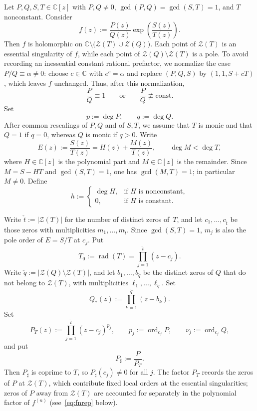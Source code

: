 \documentclass[reqno]{article}
\theoremstyle{definition}
\theoremstyle{remark}
\theoremstyle{plain}
\newcommand{\C}{\mathbb C}
\newcommand{\Z}{\mathcal Z}
\newcommand{\rad}{\operatorname{rad}}
\newcommand{\ord}{\operatorname{ord}}
\begin{document}
Let $P,Q,S,T\in\C[z]$ with $P,Q\ne0$, $\gcd(P,Q)=\gcd(S,T)=1$, and $T$ nonconstant. Consider
\begin{equation}\label{eq:fdef}
f(z):=\frac{P(z)}{Q(z)}\exp\!\left(\frac{S(z)}{T(z)}\right).
\end{equation}
Then $f$ is holomorphic on $\C\setminus\bigl(\Z(T)\cup \Z(Q)\bigr)$. Each point of $\Z(T)$ is an essential singularity of $f$, while each point of $\Z(Q)\setminus \Z(T)$ is a pole.
To avoid recording an inessential constant rational prefactor, we normalize the case $P/Q\equiv\alpha\ne0$: choose $c\in\C$ with $e^c=\alpha$ and replace $(P,Q,S)$ by $(1,1,S+cT)$, which leaves $f$ unchanged. Thus, after this normalization,
\begin{equation}\label{eq:prefactor}
\frac{P}{Q}\equiv 1\qquad\text{or}\qquad\frac{P}{Q}\not\equiv\text{const}.
\end{equation}
Set
$$p:=\deg P,\qquad q:=\deg Q.$$
After common rescalings of $P,Q$ and of $S,T$, we assume that $T$ is monic and that $Q=1$ if $q=0$, whereas $Q$ is monic if $q>0$. Write
\begin{equation}\label{eq:Edef}
E(z):=\frac{S(z)}{T(z)}=H(z)+\frac{M(z)}{T(z)},\qquad \deg M<\deg T,
\end{equation}
where $H\in\C[z]$ is the polynomial part and $M\in\C[z]$ is the remainder. Since $M=S-HT$ and $\gcd(S,T)=1$, one has $\gcd(M,T)=1$; in particular $M\ne0$. Define
\begin{equation}\label{eq:hdef}
h:=
\begin{cases}
\deg H, & \text{if } H \text{ is nonconstant},\\
0, & \text{if } H \text{ is constant}.
\end{cases}
\end{equation}

Write $\check t:=|\Z(T)|$ for the number of distinct zeros of~$T$, and let $c_1,\dots,c_{\check t}$ be those zeros with multiplicities $m_1,\dots,m_{\check t}$. Since $\gcd(S,T)=1$, $m_j$ is also the pole order of $E=S/T$ at $c_j$. Put
$$T_0:=\rad(T)=\prod_{j=1}^{\check t}(z-c_j).$$
Write $\check q:=|\Z(Q)\setminus \Z(T)|$, and let $b_1,\dots,b_{\check q}$ be the distinct zeros of $Q$ that do not belong to $\Z(T)$, with multiplicities $\ell_1,\dots,\ell_{\check q}$. Set
$$Q_\ast(z):=\prod_{k=1}^{\check q}(z-b_k).$$
Set
$$P_T(z):=\prod_{j=1}^{\check t}(z-c_j)^{p_j},\qquad p_j:=\ord_{c_j}P,\qquad \nu_j:=\ord_{c_j}Q,$$
and put
\begin{equation}\label{eq:Psh}
P_\sharp:=\frac{P}{P_T}.
\end{equation} 
Then $P_\sharp$ is coprime to $T$, so $P_\sharp(c_j)\ne0$ for all $j$. The factor $P_T$ records the zeros of $P$ at $\Z(T)$, which contribute fixed local orders at the essential singularities; zeros of $P$ away from $\Z(T)$ are accounted for separately in the polynomial factor of $f^{(n)}$ (see~\eqref{eq:fnrep} below).
\end{document}
